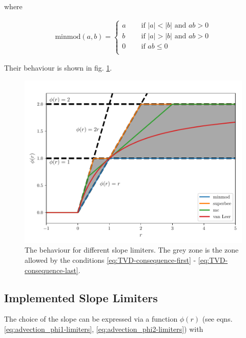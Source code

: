 where

\begin{align}
	\mathrm{minmod}(a, b) = 
		\begin{cases}
			a	& \quad \text{ if } |a| < |b| \text{ and } ab > 0\\
			b	& \quad \text{ if } |a| > |b| \text{ and } ab > 0\\
			0	& \quad \text{ if } ab \leq 0\\
		\end{cases}		
\end{align}



Their behaviour is shown in fig. \ref{fig:limiters-r-phi}.



\begin{figure}[H]
	\centering
	\includegraphics[width=.9\textwidth]{./figures/limiters.pdf}%
	\caption{
		\label{fig:limiters-r-phi}
		The behaviour for different slope limiters. The grey zone is the zone allowed by the conditions \ref{eq:TVD-consequence-first}  - \ref{eq:TVD-consequence-last}.
	}
\end{figure}








\subsection{ Implemented Slope Limiters}


The choice of the slope can be expressed via a function $\phi(r)$ (see eqns. \ref{eq:advection_phi1-limiters}, \ref{eq:advection_phi2-limiters}) with 

